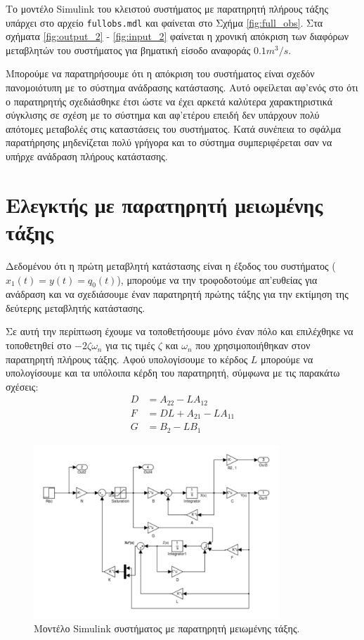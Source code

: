 \documentclass[a4paper, 11pt, english, greek]{article}
\begin{document}
Το μοντέλο \textlatin{Simulink} του κλειστού συστήματος με παρατηρητή πλήρους τάξης υπάρχει στο αρχείο
\textlatin{\texttt{fullobs.mdl}} και φαίνεται στο Σχήμα \ref{fig:full_obs}.
Στα σχήματα \ref{fig:output_2} - \ref{fig:input_2} φαίνεται η χρονική απόκριση των διαφόρων μεταβλητών του
συστήματος για βηματική είσοδο αναφοράς $0.1 m^3/s$.

Μπορούμε να παρατηρήσουμε ότι η απόκριση του συστήματος είναι σχεδόν πανομοιότυπη με το σύστημα ανάδρασης κατάστασης.
Αυτό οφείλεται αφ\textlatin{'}ενός στο ότι ο παρατηρητής σχεδιάσθηκε έτσι ώστε να έχει αρκετά καλύτερα
χαρακτηριστικά σύγκλισης
σε σχέση με το σύστημα και αφ\textlatin{'}ετέρου επειδή δεν υπάρχουν πολύ απότομες
μεταβολές στις καταστάσεις του συστήματος.
Κατά συνέπεια το σφάλμα παρατήρησης μηδενίζεται πολύ γρήγορα και το σύστημα συμπεριφέρεται σαν να υπήρχε ανάδραση
πλήρους κατάστασης.

\section{Ελεγκτής με παρατηρητή μειωμένης τάξης}
Δεδομένου ότι η πρώτη μεταβλητή κατάστασης είναι η έξοδος του συστήματος ($x_1(t) = y(t) = q_0(t)$), μπορούμε
να την τροφοδοτούμε απ\textlatin{'}ευθείας για ανάδραση και να σχεδιάσουμε έναν παρατηρητή πρώτης τάξης
για την εκτίμηση της δεύτερης μεταβλητής κατάστασης.

Σε αυτή την περίπτωση έχουμε να τοποθετήσουμε μόνο έναν πόλο και επιλέχθηκε να τοποθετηθεί στο
$-2\zeta ω_n$ για τις τιμές $\zeta$ και $ω_n$ που χρησιμοποιήθηκαν στον παρατηρητή πλήρους τάξης.
Αφού υπολογίσουμε το κέρδος $L$ μπορούμε να υπολογίσουμε και τα υπόλοιπα κέρδη του παρατηρητή,
σύμφωνα με τις παρακάτω σχέσεις:
\begin{equation}
  \begin{split}
  	\label{eq:red_obs}
  	D &= A_{22} - LA_{12}\\
  	F &= DL + A_{21} - LA_{11}\\
  	G &= B_2 - LB_1
  \end{split}
\end{equation}

\begin{figure}[h]
  \centering
  \includegraphics[width=350px]{reduced_obs}
  \caption{Μοντέλο \textlatin{Simulink} συστήματος με παρατηρητή μειωμένης τάξης.}
  \label{fig:reduced_obs}
\end{figure}
\end{document}
